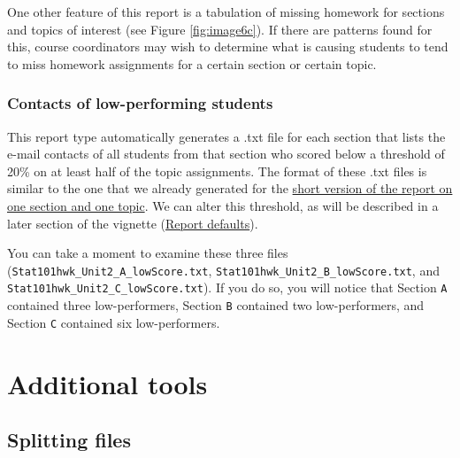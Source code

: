 \documentclass{article}\usepackage[]{graphicx}\usepackage[]{color}
\numberwithin{equation}{section} %
\begin{document}
One other feature of this report is a tabulation of missing homework for sections and topics of interest (see Figure \ref{fig:image6c}). If there are patterns found for this, course coordinators may wish to determine what is causing students to tend to miss homework assignments for a certain section or certain topic.

\begin{center}
\captionsetup{width=0.75\textwidth}
\label{fig:image6c}
\end{center}

\subsubsection{Contacts of low-performing students}
\label{sec:lowPer}

This report type automatically generates a .txt file for each section that lists the e-mail contacts of all students from that section who scored below a threshold of 20\% on at least half of the topic assignments. The format of these .txt files is similar to the one that we already generated for the \hyperref[sec:lowPerform]{short version of the report on one section and one topic}. We can alter this threshold, as will be described in a later section of the vignette (\hyperref[sec:repOptions]{Report defaults}).

You can take a moment to examine these three files (\texttt{Stat101hwk\_Unit2\_A\_lowScore.txt}, \texttt{Stat101hwk\_Unit2\_B\_lowScore.txt}, and \texttt{Stat101hwk\_Unit2\_C\_lowScore.txt}). If you do so, you will notice that Section \texttt{A} contained three low-performers, Section \texttt{B} contained two low-performers, and Section \texttt{C} contained six low-performers.

\section{Additional tools}

\subsection{Splitting files}
\end{document}
